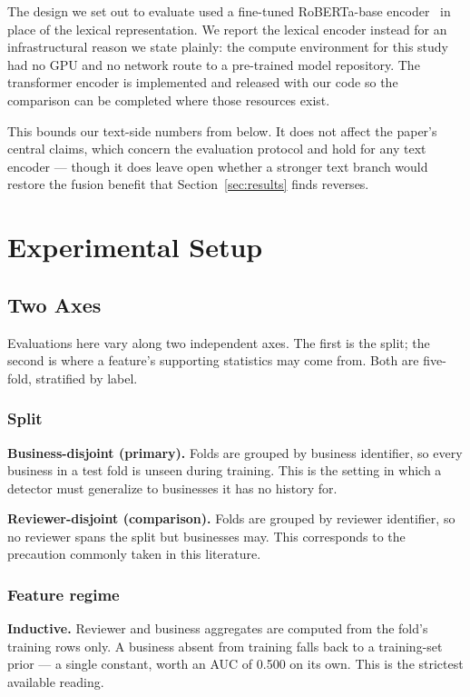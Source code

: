 \documentclass[conference]{IEEEtran}
\begin{document}
The design we set out to evaluate used a fine-tuned RoBERTa-base
encoder~\cite{liu2019roberta} in place of the lexical representation. We report
the lexical encoder instead for an infrastructural reason we state plainly: the
compute environment for this study had no GPU and no network route to a
pre-trained model repository. The transformer encoder is implemented and
released with our code so the comparison can be completed where those resources
exist.

This bounds our text-side numbers from below. It does not affect the paper's
central claims, which concern the evaluation protocol and hold for any text
encoder --- though it does leave open whether a stronger text branch would
restore the fusion benefit that Section~\ref{sec:results} finds reverses.

\section{Experimental Setup}
\label{sec:setup}

\subsection{Two Axes}
\label{sec:protocol}

Evaluations here vary along two independent axes. The first is the split; the
second is where a feature's supporting statistics may come from. Both are
five-fold, stratified by label.

\subsubsection{Split}

\textbf{Business-disjoint (primary).} Folds are grouped by business identifier,
so every business in a test fold is unseen during training. This is the setting
in which a detector must generalize to businesses it has no history for.

\textbf{Reviewer-disjoint (comparison).} Folds are grouped by reviewer
identifier, so no reviewer spans the split but businesses may. This corresponds
to the precaution commonly taken in this literature.

\subsubsection{Feature regime}

\textbf{Inductive.} Reviewer and business aggregates are computed from the
fold's training rows only. A business absent from training falls back to a
training-set prior --- a single constant, worth an AUC of 0.500 on its own.
This is the strictest available reading.
\end{document}
